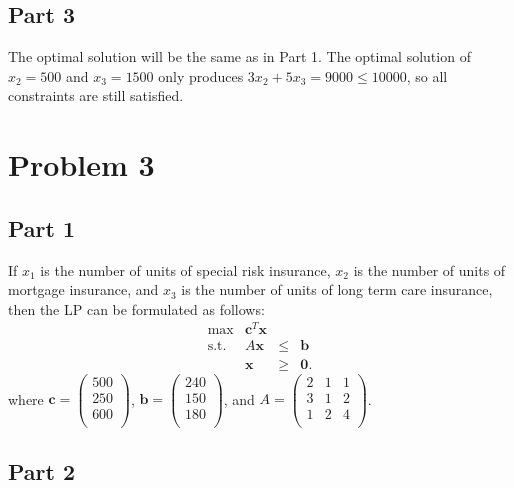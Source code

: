 \documentclass{article}
\begin{document}
\subsection{Part 3}

The optimal solution will be the same as in Part 1. The optimal solution of $x_2 = 500$ and $x_3 = 1500$ only produces $3x_2 + 5x_3 = 9000 \le 10000$, so all constraints are still satisfied.

\section{Problem 3}

\subsection{Part 1}

If $x_1$ is the number of units of special risk insurance, $x_2$ is the number of units of mortgage insurance, and $x_3$ is the number of units of long term care insurance, then the LP can be formulated as follows:
\[
\begin{array}{rrcl}
  \max & \mathbf{c}^T \mathbf{x}\\
 \mbox{s.t.}  &  A \mathbf{x}  & \le & \mathbf{b}~\\
 & \mathbf{x} & \ge & \mathbf{0}.
\end{array}
\]
where $\mathbf{c} = \left( \begin{array}{c} 500\\ 250\\ 600\\ \end{array} \right)$, $\mathbf{b} = \left( \begin{array}{c} 240\\ 150\\ 180\\ \end{array} \right)$, and $A = \left( \begin{array}{ccc} 2 & 1 & 1\\ 3 & 1 & 2\\ 1 & 2 & 4\\ \end{array} \right)$.

\subsection{Part 2}
\end{document}
